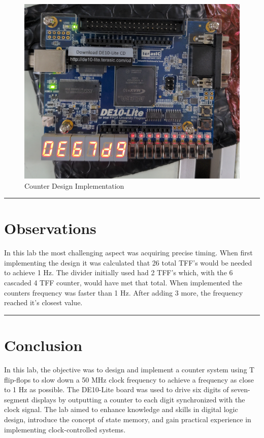 \documentclass{article}
\begin{document}
\begin{figure}[H]
  \centering
  \includegraphics*[width=1\linewidth]{implementation.png}
  \caption{Counter Design Implementation}  
\end{figure}
\vspace{5mm}
\hrule

\section*{\textcolor{mycolor}{Observations}}
In this lab the most challenging aspect was acquiring precise timing. When first implementing the design it was calculated that 26 total TFF's would be needed to achieve 1 Hz. The divider initially used had 2 TFF's which, with the 6 cascaded 4 TFF counter, would have met that total. When implemented the counters frequency was faster than 1 Hz. After adding 3 more, the frequency reached it's closest value.
\vspace{5mm}
\hrule

\section*{\textcolor{mycolor}{Conclusion}}
In this lab, the objective was to design and implement a counter system using T flip-flops to slow down a 50 MHz clock frequency to achieve a frequency as close to 1 Hz as possible. The DE10-Lite board was used to drive six digits of seven-segment displays by outputting a counter to each digit synchronized with the clock signal. The lab aimed to enhance knowledge and skills in digital logic design, introduce the concept of state memory, and gain practical experience in implementing clock-controlled systems.
\end{document}
